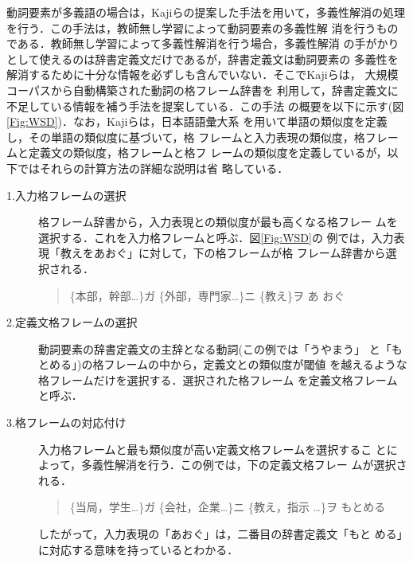 \documentclass{nlp}
\begin{document}
動詞要素が多義語の場合は，Kajiらの提案した手法を用いて，多義性解消の処理
を行う\cite{Kaji02}．この手法は，教師無し学習によって動詞要素の多義性解
消を行うものである．教師無し学習によって多義性解消を行う場合，多義性解消
の手がかりとして使えるのは辞書定義文だけであるが，辞書定義文は動詞要素の
多義性を解消するために十分な情報を必ずしも含んでいない．そこでKajiらは，
大規模コーパスから自動構築された動詞の格フレーム辞書\cite{Kawahara01}を
利用して，辞書定義文に不足している情報を補う手法を提案している．この手法
の概要を以下に示す(図\ref{Fig:WSD})．なお，Kajiらは，日本語語彙大系
\cite{Ntt97}を用いて単語の類似度を定義し，その単語の類似度に基づいて，格
フレームと入力表現の類似度，格フレームと定義文の類似度，格フレームと格フ
レームの類似度を定義しているが，以下ではそれらの計算方法の詳細な説明は省
略している．
\begin{description}
 \item[1.\hspace{5pt}入力格フレームの選択]
	    格フレーム辞書から，入力表現との類似度が最も高くなる格フレー
	    ムを選択する．これを入力格フレームと呼ぶ．図\ref{Fig:WSD}の
	    例では，入力表現「教えをあおぐ」に対して，下の格フレームが格
	    フレーム辞書から選択される．
	    \begin{quote}
	     \{本部，幹部\dots\}ガ \{外部，専門家\dots\}ニ \{教え\}ヲ あ
	     おぐ
	    \end{quote}
 \item[2.\hspace{5pt}定義文格フレームの選択]
	    動詞要素の辞書定義文の主辞となる動詞(この例では「うやまう」
	    と「もとめる」)の格フレームの中から，定義文との類似度が閾値
	    を越えるような格フレームだけを選択する．選択された格フレーム
	    を定義文格フレームと呼ぶ．
 \item[3.\hspace{5pt}格フレームの対応付け]
	    入力格フレームと最も類似度が高い定義文格フレームを選択するこ
	    とによって，多義性解消を行う．この例では，下の定義文格フレー
	    ムが選択される．
	    \begin{quote}
	     \{当局，学生\dots\}ガ \{会社，企業\dots\}ニ \{教え，指示
	     \dots\}ヲ もとめる
	    \end{quote}
	    したがって，入力表現の「あおぐ」は，二番目の辞書定義文「もと
	    める」に対応する意味を持っているとわかる．
\end{description}

\begin{figure*}[t]
 \begin{center}
  \caption{多義性の解消}
  \label{Fig:WSD}
 \end{center}
\end{figure*}
\end{document}
